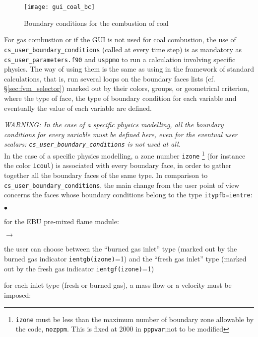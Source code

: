 {{{\begin{figure}[!ht]
\begin{center}
\texttt{[image: gui\_coal\_bc]}
\caption{Boundary conditions for the combustion of coal}
\label{fig:cond_lim-coal}
\end{center}
\end{figure}

For gas combustion or if the GUI is not used for coal combustion, the use of
\texttt{cs\_user\_boundary\_conditions} (called at every time step) is as
mandatory as \texttt{cs\_user\_parameters.f90} and \texttt{usppmo} to run a calculation involving specific physics. The way of using them is the same as using
 in the framework of standard calculations, that is, run several loops on the boundary faces lists (cf. \S\ref{sec:fvm_selector})
marked out by their colors, groups, or  geometrical criterion, where
the type of face, the type of boundary condition for each variable and
eventually the value of each variable are defined.

{\em WARNING: In the case of a specific physics modelling, all the
boundary conditions for every variable must be defined here, even for
the eventual user scalars: {\em \texttt{cs\_user\_boundary\_conditions}} is not used at all.}\\

In the case of a specific physics modelling, a zone number \texttt{izone}
\footnote{\texttt{izone} must be less than the maximum number of boundary
zone allowable by the code, \texttt{nozppm}. This is fixed at 2000 in
 \texttt{pppvar};not to be modified} (for
instance the color \texttt{icoul}) is associated with every boundary face, in
order to gather together all the boundary faces of the same type. In
comparison to \texttt{cs\_user\_boundary\_conditions}, the main change from the user point of
view concerns the faces whose boundary conditions belong to the type
\texttt{itypfb=ientre}:

\begin{list}{$\bullet$}{}
       \item for the EBU pre-mixed flame module:
             \begin{list}{$\rightarrow$}{}
                    \item the user can choose between the ``burned gas
                          inlet'' type (marked out by the burned gas indicator
                          \texttt{ientgb(izone)}=1) and the
                          ``fresh gas inlet'' type (marked out by
                          the fresh gas indicator
                          \texttt{ientgf(izone)}=1)
                    \item for each inlet type (fresh or burned
                          gas), a mass flow or a velocity must be imposed:


\end{list}
\end{list}}}}
